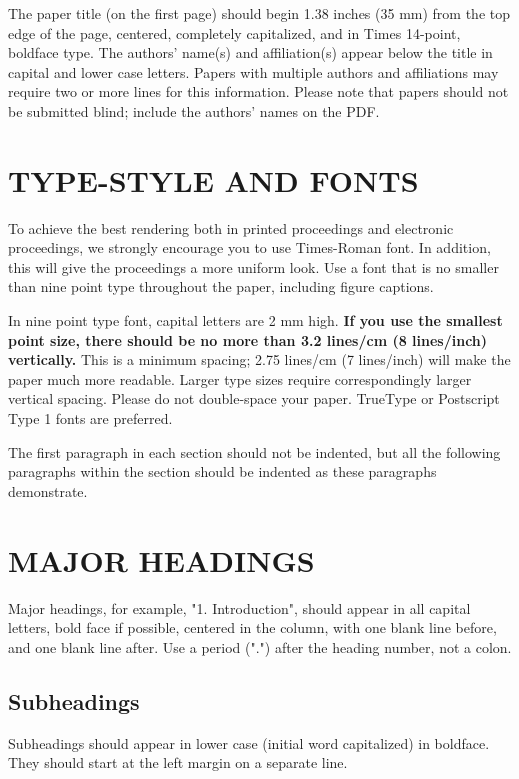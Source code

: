 \documentclass{article}
\begin{document}
The paper title (on the first page) should begin 1.38 inches (35 mm) from the
top edge of the page, centered, completely capitalized, and in Times 14-point,
boldface type.  The authors' name(s) and affiliation(s) appear below the title
in capital and lower case letters.  Papers with multiple authors and
affiliations may require two or more lines for this information. Please note
that papers should not be submitted blind; include the authors' names on the
PDF.

\section{TYPE-STYLE AND FONTS}
\label{sec:typestyle}

To achieve the best rendering both in printed proceedings and electronic proceedings, we
strongly encourage you to use Times-Roman font.  In addition, this will give
the proceedings a more uniform look.  Use a font that is no smaller than nine
point type throughout the paper, including figure captions.

In nine point type font, capital letters are 2 mm high.  {\bf If you use the
smallest point size, there should be no more than 3.2 lines/cm (8 lines/inch)
vertically.}  This is a minimum spacing; 2.75 lines/cm (7 lines/inch) will make
the paper much more readable.  Larger type sizes require correspondingly larger
vertical spacing.  Please do not double-space your paper.  TrueType or
Postscript Type 1 fonts are preferred.

The first paragraph in each section should not be indented, but all the
following paragraphs within the section should be indented as these paragraphs
demonstrate.

\section{MAJOR HEADINGS}
\label{sec:majhead}

Major headings, for example, "1. Introduction", should appear in all capital
letters, bold face if possible, centered in the column, with one blank line
before, and one blank line after. Use a period (".") after the heading number,
not a colon.

\subsection{Subheadings}
\label{ssec:subhead}

Subheadings should appear in lower case (initial word capitalized) in
boldface.  They should start at the left margin on a separate line.
 
\end{document}
